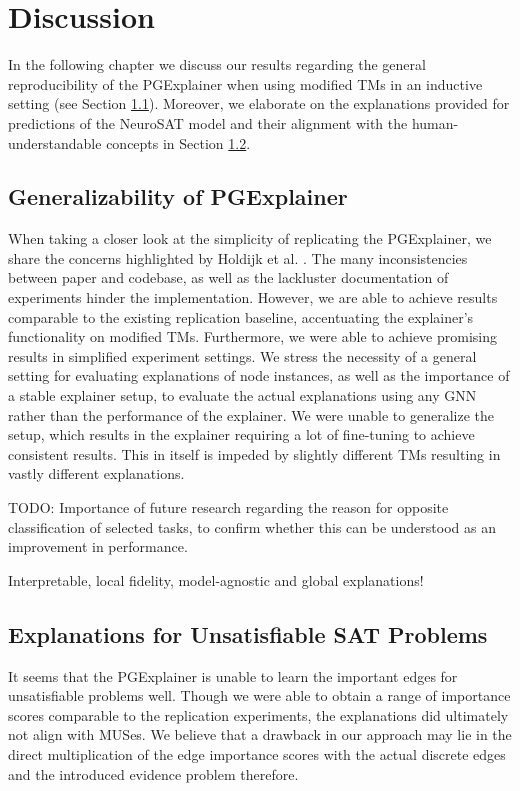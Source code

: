 \chapter{Discussion}

In the following chapter we discuss our results regarding the general reproducibility of the PGExplainer when using modified \acp{TM} in an inductive setting (see Section \ref{sec:discuss_pge}). Moreover, we elaborate on the explanations provided for predictions of the NeuroSAT model and their alignment with the human-understandable concepts in Section \ref{sec:discuss_sat}.


\section{Generalizability of PGExplainer}
\label{sec:discuss_pge}
When taking a closer look at the simplicity of replicating the PGExplainer, we share the concerns highlighted by Holdijk et al. \cite{holdijk2021re}. The many inconsistencies between paper and codebase, as well as the lackluster documentation of experiments hinder the implementation. However, we are able to achieve results comparable to the existing replication baseline, accentuating the explainer's functionality on modified \acp{TM}. Furthermore, we were able to achieve promising results in simplified experiment settings. We stress the necessity of a general setting for evaluating explanations of node instances, as well as the importance of a stable explainer setup, to evaluate the actual explanations using any GNN rather than the performance of the explainer. We were unable to generalize the setup, which results in the explainer requiring a lot of fine-tuning to achieve consistent results. This in itself is impeded by slightly different \acp{TM} resulting in vastly different explanations.

TODO:
Importance of future research regarding the reason for opposite classification of selected tasks, to confirm whether this can be understood as an improvement in performance.

Interpretable, local fidelity, model-agnostic and global explanations!

\section{Explanations for Unsatisfiable SAT Problems}
\label{sec:discuss_sat}

It seems that the PGExplainer is unable to learn the important edges for unsatisfiable problems well. Though we were able to obtain a range of importance scores comparable to the replication experiments, the explanations did ultimately not align with MUSes. We believe that a drawback in our approach may lie in the direct multiplication of the edge importance scores with the actual discrete edges and the introduced evidence problem therefore. 

